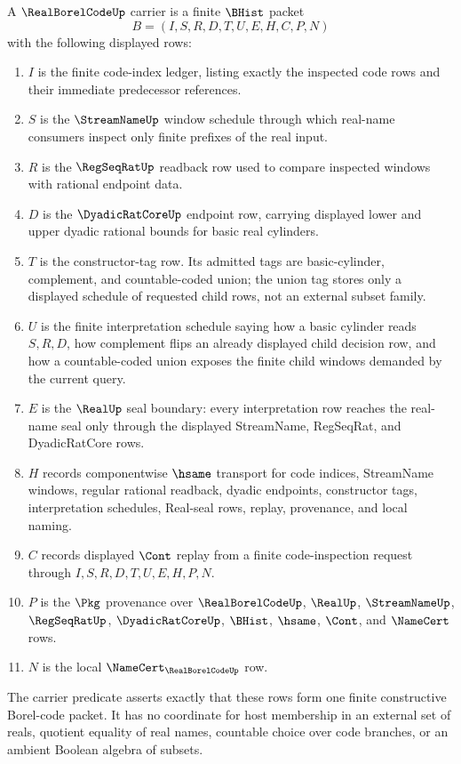 \begin{definition}
\label{def:real-borel-code-carrier}
A $\RealBorelCodeUp$ carrier is a finite $\BHist$ packet
$$
B=(I,S,R,D,T,U,E,H,C,P,N)
$$
with the following displayed rows:
\begin{enumerate}
\item $I$ is the finite code-index ledger, listing exactly the inspected code rows and their immediate predecessor references.
\item $S$ is the $\StreamNameUp$ window schedule through which real-name consumers inspect only finite prefixes of the real input.
\item $R$ is the $\RegSeqRatUp$ readback row used to compare inspected windows with rational endpoint data.
\item $D$ is the $\DyadicRatCoreUp$ endpoint row, carrying displayed lower and upper dyadic rational bounds for basic real cylinders.
\item $T$ is the constructor-tag row. Its admitted tags are basic-cylinder, complement, and countable-coded union; the union tag stores only a displayed schedule of requested child rows, not an external subset family.
\item $U$ is the finite interpretation schedule saying how a basic cylinder reads $S,R,D$, how complement flips an already displayed child decision row, and how a countable-coded union exposes the finite child windows demanded by the current query.
\item $E$ is the $\RealUp$ seal boundary: every interpretation row reaches the real-name seal only through the displayed StreamName, RegSeqRat, and DyadicRatCore rows.
\item $H$ records componentwise $\hsame$ transport for code indices, StreamName windows, regular rational readback, dyadic endpoints, constructor tags, interpretation schedules, Real-seal rows, replay, provenance, and local naming.
\item $C$ records displayed $\Cont$ replay from a finite code-inspection request through $I,S,R,D,T,U,E,H,P,N$.
\item $P$ is the $\Pkg$ provenance over $\RealBorelCodeUp$, $\RealUp$, $\StreamNameUp$, $\RegSeqRatUp$, $\DyadicRatCoreUp$, $\BHist$, $\hsame$, $\Cont$, and $\NameCert$ rows.
\item $N$ is the local $\NameCert_{\RealBorelCodeUp}$ row.
\end{enumerate}
The carrier predicate asserts exactly that these rows form one finite constructive Borel-code packet. It has no coordinate for host membership in an external set of reals, quotient equality of real names, countable choice over code branches, or an ambient Boolean algebra of subsets.
\end{definition}

